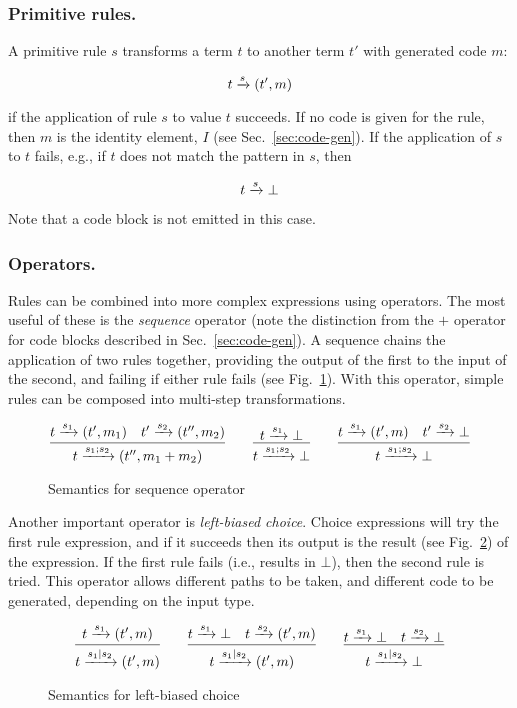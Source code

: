 \subsubsection{Primitive rules.}

A primitive rule $s$ transforms a term $t$ to another term $t'$ with generated code $m$:

\[
t \xrightarrow{s} (t',m)
\]

if the application of rule $s$ to value $t$ succeeds. If no code is given for the rule, then $m$ is the identity element, $I$ (see Sec.~\ref{sec:code-gen}). If the application of $s$ to $t$ fails, e.g., if $t$ does not match the pattern in $s$, then

\[
t \xrightarrow{s} \bot
\]

Note that a code block is not emitted in this case.

\subsubsection{Operators.}

Rules can be combined into more complex expressions using operators. The most useful of these is the \emph{sequence} operator (note the distinction from the $+$ operator for code blocks described in Sec.~\ref{sec:code-gen}). A sequence chains the application of two rules together, providing the output of the first to the input of the second, and failing if either rule fails (see Fig.~\ref{fig:twig-seq}). With this operator, simple rules can be composed into multi-step transformations.

\begin{figure}[ht]
\[
\infer{t \arr{s_1;s_2} (t'',m_1+m_2)}{t \arr{s_1} (t',m_1) \quad t' \arr{s_2} (t'',m_2)}
\qquad 
\infer{t \arr{s_1;s_2} \bot}{t \arr{s_1} \bot}
\qquad
\infer{t \arr{s_1;s_2} \bot}{t \arr{s_1} (t',m) \quad t' \arr{s_2} \bot}
\]
\caption{Semantics for sequence operator}
\label{fig:twig-seq}
\end{figure}

Another important operator is \emph{left-biased choice}. Choice expressions will try the first rule expression, and if it succeeds then its output is the result (see Fig.~\ref{fig:twig-choice}) of the expression. If the first rule fails (i.e., results in $\bot$), then the second rule is tried. This operator allows different paths to be taken, and different code to be generated, depending on the input type.

\begin{figure}[ht]
\[
\infer{t \arr{s_1|s_2} (t',m)}{t \arr{s_1} (t',m)}
\qquad 
\infer{t \arr{s_1|s_2} (t',m)}{t \arr{s_1} \bot \quad t \arr{s_2} (t',m)}
\qquad
\infer{t \arr{s_1|s_2} \bot}{t \arr{s_1} \bot \quad t \arr{s_2} \bot}
\]
\caption{Semantics for left-biased choice}
\label{fig:twig-choice}
\end{figure}

